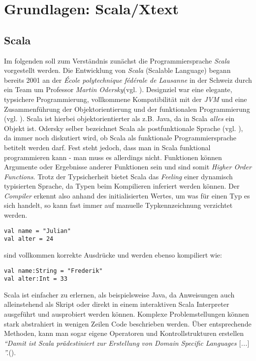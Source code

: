 \chapter{Grundlagen: Scala/Xtext}
\section{Scala}
Im folgenden soll zum Verständnis zunächst die Programmiersprache \textit{Scala} vorgestellt werden.
Die Entwicklung von \textit{Scala} (Scalable Language) begann bereits 2001 an der\textit{ École polytechnique fédérale de Lausanne} in der Schweiz durch ein Team um Professor \textit{Martin Odersky}(vgl. \citet[p. 1]{braun:scala}). Designziel war eine elegante, typsichere Programmierung, vollkommene Kompatibilität mit der \textit{JVM} und eine Zusammenführung der Objektorientierung und der funktionalen Programmierung (vgl. \citet[p. 2]{braun:scala}). Scala ist hierbei objektorientierter als z.B. Java, da in Scala \textit{alles} ein Objekt ist. Odersky selber bezeichnet Scala als postfunktionale Sprache (vgl. \citet[p. 2]{braun:scala}), da immer noch diskutiert wird, ob Scala als funktionale Programmiersprache betitelt werden darf. Fest steht jedoch, dass man in Scala funktional programmieren kann - man muss es allerdings nicht. Funktionen können Argumente oder Ergebnisse anderer Funktionen sein und sind somit \textit{Higher Order Functions}. Trotz der Typsicherheit bietet Scala das \textit{Feeling} einer dynamisch typisierten Sprache, da Typen beim Kompilieren inferiert werden können. Der \textit{Compiler} erkennt also anhand des initialisierten Wertes, um was für einen Typ es sich handelt, so kann fast immer auf manuelle Typkennzeichnung verzichtet werden.
\begin{lstlisting}[style = scala]
val name = "Julian"
val alter = 24
\end{lstlisting}
sind vollkommen korrekte Ausdrücke und werden ebenso kompiliert wie:
\begin{lstlisting}[style = scala]
val name:String = "Frederik"
val alter:Int = 33
\end{lstlisting}
Scala ist einfacher zu erlernen, als beispielsweise Java, da Anweisungen auch alleinstehend als Skript oder direkt in einem interaktiven Scala Interpreter ausgeführt und ausprobiert werden können. 
Komplexe Problemstellungen können stark abstrahiert in wenigen Zeilen Code beschrieben werden. Über entsprechende Methoden, kann man sogar eigene Operatoren und Kontrollstrukturen erstellen \textit{"`Damit ist Scala prädestiniert zur Erstellung von Domain Specific Languages $[$...$]$"'.}(\citet[p. 2]{braun:scala}).
